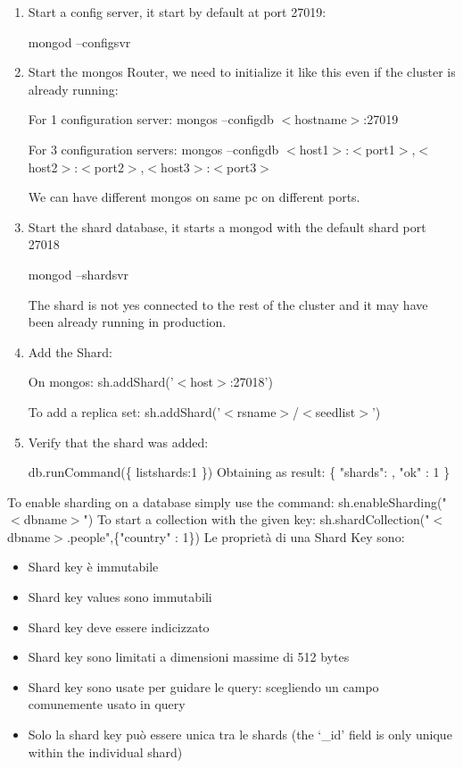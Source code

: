 \documentclass[a4page, 11pt]{article}
\begin{document}
\begin{enumerate}[noitemsep]
	\item Start a config server, it start by default at port 27019:

	mongod --configsvr
	\item Start the mongos Router, we need to initialize it like this even if the cluster is already running:
	
	For 1 configuration server: 
	mongos --configdb $<$hostname$>$:27019
	
	For 3 configuration servers:
	mongos --configdb $<$host1$>$:$<$port1$>$,$<$host2$>$:$<$port2$>$,$<$host3$>$:$<$port3$>$
	
	We can have different mongos on same pc on different ports.
	\item Start the shard database, it starts a mongod with the default shard port 27018
	
	mongod --shardsvr
	
	The shard is not yes connected to the rest of the cluster and it may have been already running in production.
	\item Add the Shard:
	
	On mongos: 
	sh.addShard('$<$host$>$:27018')
	
	To add a replica set: 
	sh.addShard('$<$rsname$>$/$<$seedlist$>$')
	\item Verify that the shard was added:
	
	db.runCommand(\{ listshards:1 \}) \newline
	Obtaining as result: \newline
	\{\newline
	"shards": , \newline
	"ok" : 1 \newline
	\}
\end{enumerate} 
To enable sharding on a database simply use the command: sh.enableSharding("$<$dbname$>$") 
\newline To start a collection with the given key:
sh.shardCollection("$<$dbname$>.$people",\{"country" : 1\})
\newline
Le proprietà di una Shard Key sono:
\begin{itemize}[noitemsep]
	\item Shard key è immutabile
	\item Shard key values sono immutabili
	\item Shard key deve essere indicizzato
	\item Shard key sono limitati a dimensioni massime di 512 bytes
	\item Shard key sono usate per guidare le query: scegliendo un campo comunemente usato in query
	\item Solo la shard key può essere unica tra le shards (the `\_id' field is only unique within the individual shard)
\end{itemize}
\end{document}
